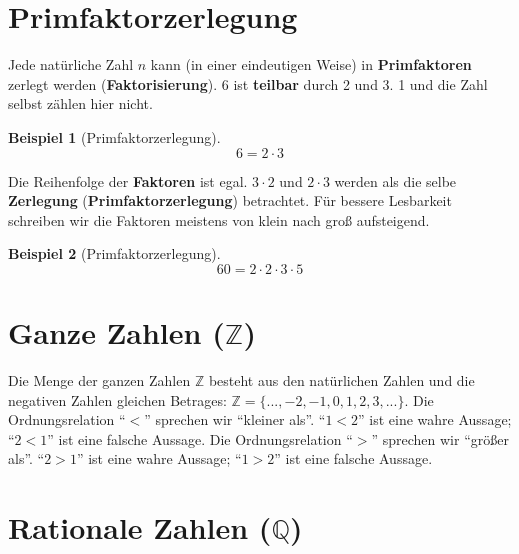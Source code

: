 \documentclass[a4paper]{book}%
\theoremstyle{definition}
\newtheorem{beispiel}{Beispiel}
\begin{document}
\section{Primfaktorzerlegung}

Jede natürliche Zahl $n$ kann (in einer eindeutigen Weise) in \textbf{Primfaktoren} zerlegt werden (\textbf{Faktorisierung}). 6 ist \textbf{teilbar} durch 2 und 3. 1 und die Zahl selbst zählen hier nicht.

\begin{beispiel}[Primfaktorzerlegung]
    \begin{equation}\label{eqn:primfaktorzerlegung01}
        6 = 2 \cdot 3
    \end{equation}
\end{beispiel}

Die Reihenfolge der \textbf{Faktoren} ist egal. $3 \cdot 2$ und $2 \cdot 3$ werden als die selbe \textbf{Zerlegung} (\textbf{Primfaktorzerlegung}) betrachtet. Für bessere Lesbarkeit schreiben wir die Faktoren meistens von klein nach groß aufsteigend.

\begin{beispiel}[Primfaktorzerlegung]
    \begin{equation}\label{eqn:primfaktorzerlegung02}
        60 = 2 \cdot 2 \cdot 3 \cdot 5
    \end{equation}
\end{beispiel}


\section{Ganze Zahlen ($\mathbb{Z}$)}

Die Menge der ganzen Zahlen $\mathbb{Z}$ besteht aus den natürlichen Zahlen und die negativen Zahlen gleichen Betrages: $\mathbb{Z}=\{..., -2, -1, 0, 1, 2, 3, ...\}$. Die Ordnungsrelation \enquote{$<$}\index{$<$} sprechen wir \enquote{kleiner als}. \enquote{$1<2$} ist eine wahre Aussage; \enquote{$2<1$} ist eine falsche Aussage. Die Ordnungsrelation \enquote{$>$}\index{$>$} sprechen wir \enquote{größer als}. \enquote{$2>1$} ist eine wahre Aussage; \enquote{$1>2$} ist eine falsche Aussage.


\section{Rationale Zahlen ($\mathbb{Q}$)}
\end{document}
